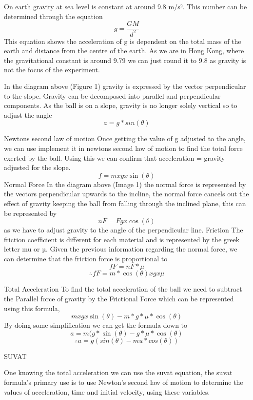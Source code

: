 \documentclass[12pt]{report}
\begin{document}
On earth gravity at sea level is constant at around 9.8 m/s². This number can be determined through the equation
\[g = \frac{GM}{d^2}\]
This equation shows the acceleration of g is dependent on the total mass of the earth and distance from the centre of the earth.  As we are in Hong Kong, where the gravitational constant is around 9.79 we can just round it to 9.8 as gravity is not the focus of the experiment.

In the diagram above (Figure 1) gravity is expressed by the vector perpendicular to the slope. Gravity can be decomposed into parallel and perpendicular components. As the ball is on a slope, gravity is no longer solely vertical so to adjust the angle
\[a = g*sin(\theta)\]

{\large{Newtons second law of motion}}
\newline
Once getting the value of g adjusted to the angle, we can use implement it in newtons second law of motion to find the total force exerted by the ball.
Using this we can confirm that acceleration = gravity adjusted for the slope.
\[f = m x g x \sin(\theta)\]
\newline
{\large{Normal Force}}
\newline
In the diagram above (Image 1) the normal force is represented by the vectors perpendicular upwards to the incline, the normal force cancels out the effect of gravity keeping the ball from falling through the inclined plane, this can be represented by
\[nF = Fg x \cos(\theta)\]
as we have to adjust gravity to the angle of the perpendicular line.
\newline
{\large{Friction}}
\newline
The friction coefficient is different for each material and is represented by the greek letter mu or µ.
Given the previous information regarding the normal force, we can determine that the friction force is proportional to
\[fF = nF * \mu\]
\[∴ fF = m * \cos(\theta) x g x \mu\]

{\large{Total Acceleration}}
\newline
To find the total acceleration of the ball we need to subtract the Parallel force of gravity by the  Frictional Force which can be represented using this formula,
\[m x g x \sin(\theta)- m *g*\mu*\cos(\theta)\]
By doing some simplification we can get the formula down to
\[a = m(g*\sin(\theta) - g*\mu*\cos(\theta)\]
\[∴ a = g(sin(θ) - mu*cos(θ))\]

{\large{SUVAT}}
\newline

One knowing the total acceleration we can use the suvat equation, the suvat formula’s primary use is to use Newton's second law of motion to determine the values of acceleration, time and initial velocity, using these variables.
\end{document}

